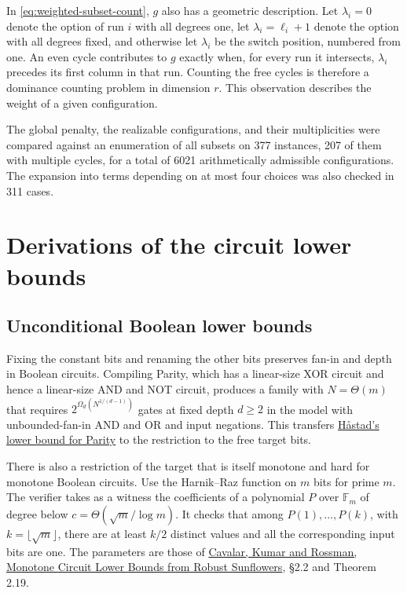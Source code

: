 \documentclass[11pt,a4paper]{article}
\numberwithin{equation}{section}
\begin{document}
In \eqref{eq:weighted-subset-count}, \(g\) also has a geometric description. Let \(\lambda_i=0\) denote the option of run \(i\) with all degrees one, let \(\lambda_i=\ell_i+1\) denote the option with all degrees fixed, and otherwise let \(\lambda_i\) be the switch position, numbered from one. An even cycle contributes to \(g\) exactly when, for every run it intersects, \(\lambda_i\) precedes its first column in that run. Counting the free cycles is therefore a dominance counting problem in dimension \(r\). This observation describes the weight of a given configuration.

The global penalty, the realizable configurations, and their multiplicities were compared against an enumeration of all subsets on 377 instances, 207 of them with multiple cycles, for a total of 6021 arithmetically admissible configurations. The expansion into terms depending on at most four choices was also checked in 311 cases.

\section{Derivations of the circuit lower bounds}\label{derivations-of-the-circuit-lower-bounds}

\subsection{Unconditional Boolean lower bounds}\label{unconditional-boolean-lower-bounds}

Fixing the constant bits and renaming the other bits preserves fan-in and depth in Boolean circuits. Compiling Parity, which has a linear-size XOR circuit and hence a linear-size AND and NOT circuit, produces a family with \(N=\Theta(m)\) that requires \(2^{\Omega_d(N^{1/(d-1)})}\) gates at fixed depth \(d\ge2\) in the model with unbounded-fan-in AND and OR and input negations. This transfers \href{https://eccc.weizmann.ac.il/report/2019/073/}{Håstad's lower bound for Parity} to the restriction to the free target bits.

There is also a restriction of the target that is itself monotone and hard for monotone Boolean circuits. Use the Harnik--Raz function on \(m\) bits for prime \(m\). The verifier takes as a witness the coefficients of a polynomial \(P\) over \(\mathbb F_m\) of degree below \(c=\Theta(\sqrt m/\log m)\). It checks that among \(P(1),\ldots,P(k)\), with \(k=\lfloor\sqrt m\rfloor\), there are at least \(k/2\) distinct values and all the corresponding input bits are one. The parameters are those of \href{https://eccc.weizmann.ac.il/report/2020/181/revision/2/download/}{Cavalar, Kumar and Rossman, Monotone Circuit Lower Bounds from Robust Sunflowers}, §2.2 and Theorem 2.19.
\end{document}
